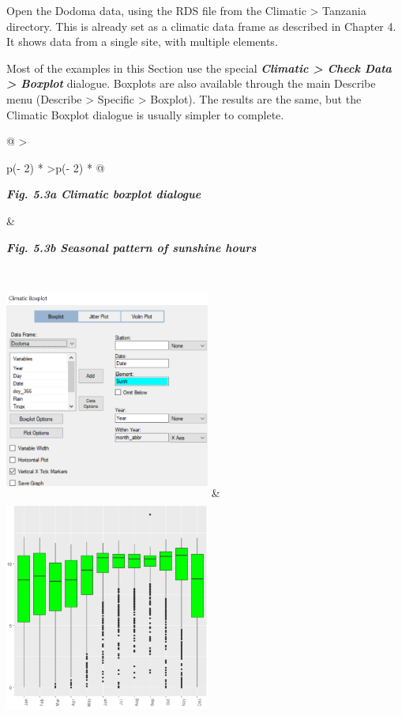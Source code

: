 \documentclass[
  letterpaper,
  DIV=11,
  numbers=noendperiod]{scrreprt}
\begin{document}
Open the Dodoma data, using the RDS file from the Climatic
\textgreater{} Tanzania directory. This is already set as a climatic
data frame as described in Chapter 4. It shows data from a single site,
with multiple elements.

Most of the examples in this Section use the special
\textbf{\emph{Climatic \textgreater{} Check Data \textgreater{}
Boxplot}} dialogue. Boxplots are also available through the main
Describe menu (Describe \textgreater{} Specific \textgreater{} Boxplot).
The results are the same, but the Climatic Boxplot dialogue is usually
simpler to complete.

\begin{longtable}[]{@{}
  >{\raggedright\arraybackslash}p{(\columnwidth - 2\tabcolsep) * }
  >{\centering\arraybackslash}p{(\columnwidth - 2\tabcolsep) * }@{}}
\toprule\noalign{}
\begin{minipage}[b]{\linewidth}\raggedright
\textbf{\emph{Fig. 5.3a Climatic boxplot dialogue}}
\end{minipage} & \begin{minipage}[b]{\linewidth}\centering
\textbf{\emph{Fig. 5.3b Seasonal pattern of sunshine hours}}
\end{minipage} \\
\midrule\noalign{}
\endhead
\bottomrule\noalign{}
\endlastfoot
\includegraphics[width=2.65607in,height=2.83047in]{figures/Fig5.3a.png}
&
\includegraphics[width=2.65607in,height=2.83047in]{figures/Fig5.3b.png} \\
\end{longtable}
\end{document}
